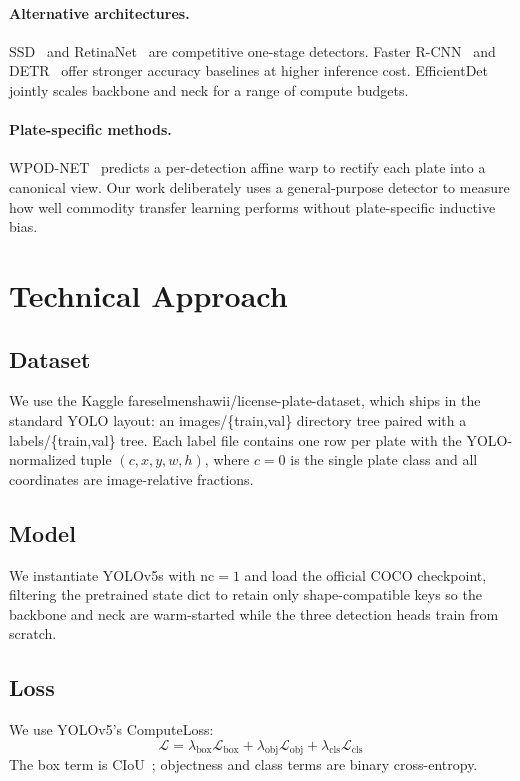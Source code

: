 \documentclass[times,10pt,twocolumn]{article}
\begin{document}
\paragraph{Alternative architectures.}
SSD~\cite{liu2016ssd} and RetinaNet~\cite{lin2017focal} are competitive
one-stage detectors. Faster R-CNN~\cite{ren2015faster} and
DETR~\cite{carion2020detr} offer stronger accuracy baselines at higher
inference cost. EfficientDet~\cite{tan2020efficientdet} jointly scales
backbone and neck for a range of compute budgets.

\paragraph{Plate-specific methods.}
WPOD-NET~\cite{silva2018wpodnet} predicts a per-detection affine warp
to rectify each plate into a canonical view. Our work deliberately uses
a general-purpose detector to measure how well commodity transfer
learning performs without plate-specific inductive bias.

\section{Technical Approach}
\label{sec:method}

\subsection{Dataset}
\label{sec:data}
We use the Kaggle fareselmenshawii/license-plate-dataset,
which ships in the standard YOLO layout: an
images/\{train,val\} directory tree paired with a
labels/\{train,val\} tree. Each label file contains one row per plate
with the YOLO-normalized tuple $(c, x, y, w, h)$, where $c=0$ is the
single plate class and all coordinates are image-relative fractions.

\subsection{Model}
\label{sec:model}
We instantiate YOLOv5s with $\text{nc}=1$ and load the official COCO
checkpoint, filtering the pretrained state dict to retain only
shape-compatible keys so the backbone and neck are warm-started while
the three detection heads train from scratch.

\subsection{Loss}
\label{sec:loss}
We use YOLOv5's ComputeLoss:
\[
  \mathcal{L} = \lambda_{\text{box}}\mathcal{L}_{\text{box}} +
  \lambda_{\text{obj}}\mathcal{L}_{\text{obj}} +
  \lambda_{\text{cls}}\mathcal{L}_{\text{cls}}
\]
The box term is CIoU~\cite{zheng2020ciou}; objectness and class terms
are binary cross-entropy.
\end{document}
